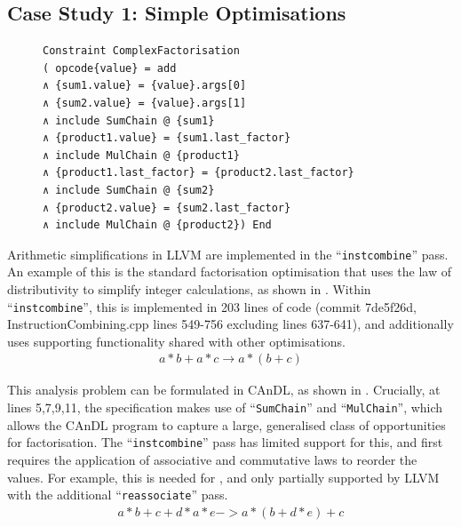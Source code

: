 \subsection{Case Study 1: Simple Optimisations}

\begin{figure}[t]
\vspace{3.6mm}
\begin{lstlisting}[language=CAnDL,label={fig:facopport},caption=
   {Factorisation opportunities in CAnDL: This captures some opportunities that
    LLVM ``{\tt instcombine}'' misses. ``{\tt SumChain}'', ``{\tt MulChain}''
    are themselves specified in CAnDL (16 LoC).}]
Constraint ComplexFactorisation
( opcode{value} = add
∧ {sum1.value} = {value}.args[0]
∧ {sum2.value} = {value}.args[1]
∧ include SumChain @ {sum1}
∧ {product1.value} = {sum1.last_factor}
∧ include MulChain @ {product1}
∧ {product1.last_factor} = {product2.last_factor}
∧ include SumChain @ {sum2}
∧ {product2.value} = {sum2.last_factor}
∧ include MulChain @ {product2}) End
\end{lstlisting}
\end{figure}

    Arithmetic simplifications in LLVM are implemented in the
    ``{\tt instcombine}'' pass.
    An example of this is the standard factorisation optimisation that uses the
    law of distributivity to simplify integer calculations, as shown in
    .
    Within ``{\tt instcombine}'', this is implemented in 203 lines of code
    (commit 7de5f26d, InstructionCombining.cpp lines 549-756 excluding lines 637-641),
    and additionally uses supporting functionality shared with other
    optimisations.
    \begin{align}
        a*b+a*c\rightarrow a*(b+c)
        \label{fig:factorization1}
    \end{align}

    This analysis problem can be formulated in CAnDL, as shown in
    .
    Crucially, at lines 5,7,9,11, the specification makes use of
    ``{\tt SumChain}'' and ``{\tt MulChain}'', which allows the CAnDL program to
    capture a large, generalised class of opportunities for factorisation.
    The ``{\tt instcombine}'' pass has limited support for this, and first
    requires the application of associative and commutative laws to reorder the
    values.
    For example, this is needed for , and only
    partially supported by LLVM with the additional ``{\tt reassociate}''
    pass.
    \begin{align}
        a*b+c+d*a*e->a*(b+d*e)+c
        \label{fig:factorization2}
    \end{align}

